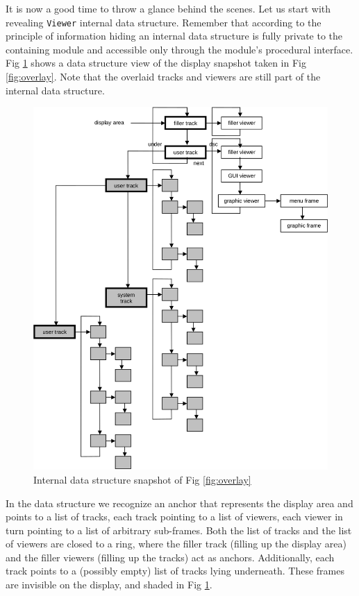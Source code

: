 It is now a good time to throw a glance behind the scenes.
Let us start with revealing \verb|Viewer| internal data structure.
Remember that according to the principle of information hiding
an internal data structure is fully private to the containing module
and accessible only through the module’s procedural interface.  Fig \ref{fig:snapshot}
shows a data structure view of the display snapshot taken in Fig \ref{fig:overlay}.
Note that the overlaid tracks and viewers are still part of the internal data structure.
\begin{figure}[h!]
  \centering
  \includegraphics[width=\textwidth]{i/9}
  \caption{Internal data structure snapshot of Fig \ref{fig:overlay}}
  \label{fig:snapshot}
\end{figure}

In the data structure we recognize an anchor that represents the display area
and points to a list of tracks, each track pointing to a list of viewers,
each viewer in turn pointing to a list of arbitrary sub-frames.
Both the list of tracks and the list of viewers are closed to a ring,
where the filler track (filling up the display area)
and the filler viewers (filling up the tracks) act as anchors.
Additionally, each track points to a (possibly empty) list of tracks lying underneath.
These frames are invisible on the display, and shaded in Fig \ref{fig:snapshot}.

